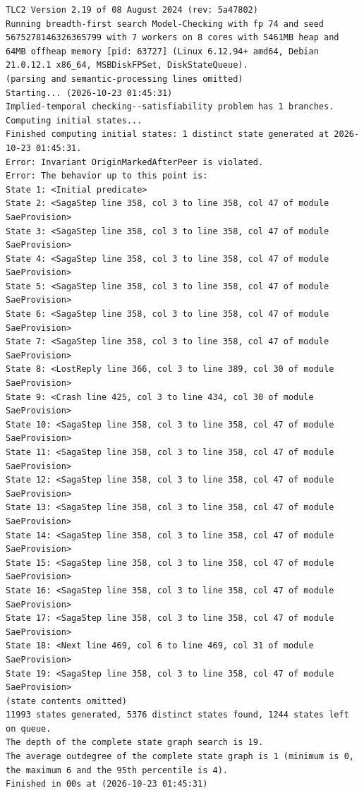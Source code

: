 \documentclass[11pt,a4paper]{article}
\begin{document}
\begin{lstlisting}[float, caption={mutations/mut\_b\_nofence.cfg result}, captionpos=t, label={lst:tlc-mut-b-nofence}]
TLC2 Version 2.19 of 08 August 2024 (rev: 5a47802)
Running breadth-first search Model-Checking with fp 74 and seed 5675278146326365799 with 7 workers on 8 cores with 5461MB heap and 64MB offheap memory [pid: 63727] (Linux 6.12.94+ amd64, Debian 21.0.12.1 x86_64, MSBDiskFPSet, DiskStateQueue).
(parsing and semantic-processing lines omitted)
Starting... (2026-10-23 01:45:31)
Implied-temporal checking--satisfiability problem has 1 branches.
Computing initial states...
Finished computing initial states: 1 distinct state generated at 2026-10-23 01:45:31.
Error: Invariant OriginMarkedAfterPeer is violated.
Error: The behavior up to this point is:
State 1: <Initial predicate>
State 2: <SagaStep line 358, col 3 to line 358, col 47 of module SaeProvision>
State 3: <SagaStep line 358, col 3 to line 358, col 47 of module SaeProvision>
State 4: <SagaStep line 358, col 3 to line 358, col 47 of module SaeProvision>
State 5: <SagaStep line 358, col 3 to line 358, col 47 of module SaeProvision>
State 6: <SagaStep line 358, col 3 to line 358, col 47 of module SaeProvision>
State 7: <SagaStep line 358, col 3 to line 358, col 47 of module SaeProvision>
State 8: <LostReply line 366, col 3 to line 389, col 30 of module SaeProvision>
State 9: <Crash line 425, col 3 to line 434, col 30 of module SaeProvision>
State 10: <SagaStep line 358, col 3 to line 358, col 47 of module SaeProvision>
State 11: <SagaStep line 358, col 3 to line 358, col 47 of module SaeProvision>
State 12: <SagaStep line 358, col 3 to line 358, col 47 of module SaeProvision>
State 13: <SagaStep line 358, col 3 to line 358, col 47 of module SaeProvision>
State 14: <SagaStep line 358, col 3 to line 358, col 47 of module SaeProvision>
State 15: <SagaStep line 358, col 3 to line 358, col 47 of module SaeProvision>
State 16: <SagaStep line 358, col 3 to line 358, col 47 of module SaeProvision>
State 17: <SagaStep line 358, col 3 to line 358, col 47 of module SaeProvision>
State 18: <Next line 469, col 6 to line 469, col 31 of module SaeProvision>
State 19: <SagaStep line 358, col 3 to line 358, col 47 of module SaeProvision>
(state contents omitted)
11993 states generated, 5376 distinct states found, 1244 states left on queue.
The depth of the complete state graph search is 19.
The average outdegree of the complete state graph is 1 (minimum is 0, the maximum 6 and the 95th percentile is 4).
Finished in 00s at (2026-10-23 01:45:31)
\end{lstlisting}
\bigskip
\end{document}
